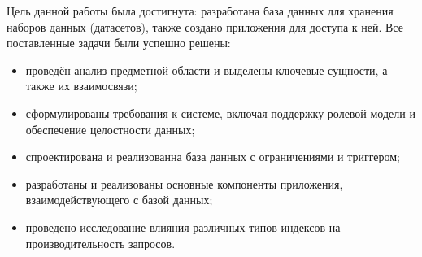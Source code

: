
Цель данной работы была достигнута: разработана база данных для хранения
наборов данных (датасетов), также создано приложения для доступа к ней.
Все поставленные задачи были успешно решены:

\begin{itemize}
\item проведён анализ предметной области и выделены ключевые сущности, а также их взаимосвязи;
\item сформулированы требования к системе, включая поддержку ролевой модели и обеспечение целостности данных;
\item спроектирована и реализованна база данных с ограничениями и триггером;
\item разработаны и реализованы основные компоненты приложения, взаимодействующего с базой данных;
\item проведено исследование влияния различных типов индексов на производительность запросов.

\end{itemize}







